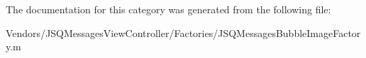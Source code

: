 The documentation for this category was generated from the following file\+:\begin{DoxyCompactItemize}
\item 
Vendors/\+J\+S\+Q\+Messages\+View\+Controller/\+Factories/J\+S\+Q\+Messages\+Bubble\+Image\+Factory.\+m\end{DoxyCompactItemize}
